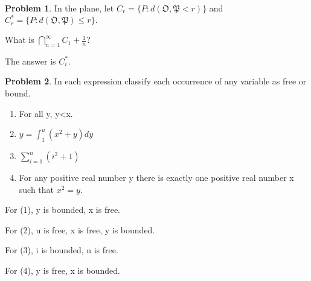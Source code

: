 \documentclass[a4paper,11pt]{article}%
\theoremstyle{remark}
\theoremstyle{definition}
\newtheorem{problem}{Problem}[subsection]
\begin{document}
\begin{problem}
    In the plane, let $C_r=\{P:d(\mathfrak{O} ,\mathfrak{P} <r )\}$ and $C_r^*=\{P:d(\mathfrak{O}, \mathfrak{P} )\leq r\}.$

    What is $\bigcap^{\infty}_{n=1}{C_1+\frac{1}{n}}$?
    
    The answer is $C_i^*.$
\end{problem}
\begin{problem}
    In each expression classify each occurrence of any variable as free or bound.
\begin{enumerate}
    \item For all y, y<x.
    \item $y=\int_{1}^{u}(x^2+y)dy$
    \item $\sum_{i=1}^{n}(i^2+1)$
    \item For any positive real number y there is exactly one positive real number x such that $x^2=y$.
\end{enumerate}

For (1), y is bounded, x is free.

For (2), u is free, x is free, y is bounded.

For (3), i is bounded, n is free.

For (4), y is free, x is bounded.
\end{problem}
\end{document}
